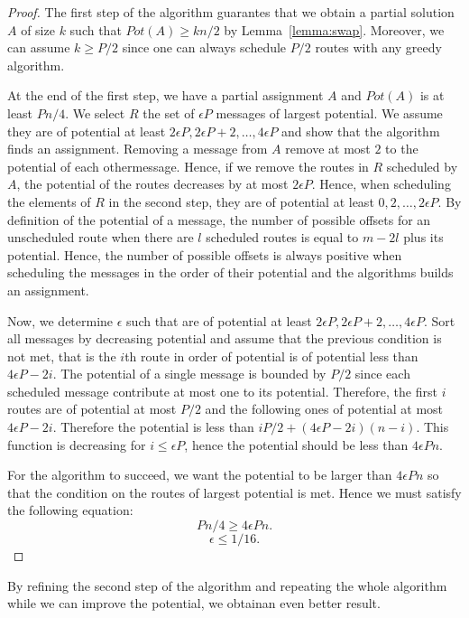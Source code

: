 \documentclass[10pt, conference, letterpaper]{IEEEtran}
\begin{document}
\begin{proof}
 The first step of the algorithm guarantes that we obtain a partial solution 
 $A$ of size $k$ such that $Pot(A) \geq kn/2$ by Lemma~\ref{lemma:swap}. 
Moreover, we can assume $k \geq P/2$ since one can always schedule $P/2$ routes with any greedy algorithm.
 
At the end of the first step, we have a partial assignment $A$ and $Pot(A)$ is at least $Pn/4$. We select $R$ the set of $\epsilon P$ messages of largest potential. We assume they are of potential at least $2\epsilon P, 2\epsilon P +2,\dots ,4\epsilon P$ and show that the algorithm finds an assignment. Removing a message from $A$ remove at most $2$ to the 
potential of each othermessage. Hence, if we remove the routes in $R$ scheduled by $A$, the potential of the routes decreases by at most $2\epsilon P$. Hence, when scheduling the elements of $R$ in the second step, they are of potential at least $0, 2,\dots ,2\epsilon P$.
By definition of the potential of a message, the number of possible offsets for an unscheduled route when there are $l$ scheduled routes is equal to $m - 2l$ plus its potential. Hence, the number of possible offsets is always positive when scheduling the messages in the order of their potential and the algorithms builds an assignment.

Now, we determine $\epsilon$ such that are of potential at least $2\epsilon P, 2\epsilon P +2,\dots ,4\epsilon P$. Sort all messages by decreasing potential and assume that the previous condition is not met, that is the $i$th route in order of potential is of potential less than $4\epsilon P - 2i$. The potential of a single message is bounded by $P/2$ since each scheduled message contribute at most one to its potential. Therefore, the first
$i$ routes are of potential at most $P/2$ and the following ones of potential at most $4\epsilon P - 2i$. Therefore the potential is less than $iP/2 + (4\epsilon P - 2i) (n -i)$. This function is decreasing for $i \leq \epsilon P$, hence the potential should be less than $4\epsilon P n$.
 
 For the algorithm to succeed, we want the potential to be larger than $4\epsilon P n$ so that the condition on the routes of largest potential is met.
Hence we must satisfy the following equation:
 $$Pn/4 \geq 4\epsilon P n.$$
 $$ \epsilon \leq 1/16.$$
\end{proof}

By refining the second step of the algorithm and repeating the whole algorithm while 
we can improve the potential, we obtainan even better result.
\end{document}
